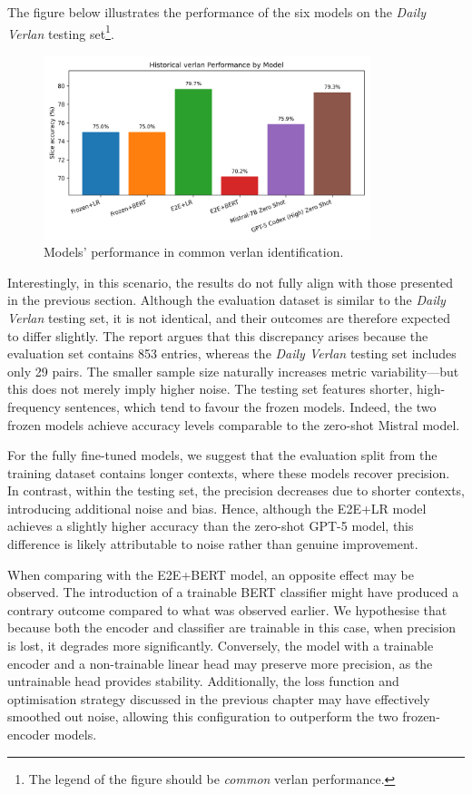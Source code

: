 \documentclass[12pt]{article}
\begin{document}
The figure below illustrates the performance of the six models on the \textit{Daily Verlan} testing set\footnote{The legend of the figure should be \textit{common} verlan performance.}.

\begin{figure}[H]
    \centering
    \includegraphics[width=0.85\textwidth]{figures/historical_verlan_comparison.png}
    \caption{Models' performance in common verlan identification.}
    \label{fig:historical-verlan-comparison}
\end{figure}

Interestingly, in this scenario, the results do not fully align with those presented in the previous section. 
Although the evaluation dataset is similar to the \textit{Daily Verlan} testing set, it is not identical, and their outcomes are therefore expected to differ slightly. 
The report argues that this discrepancy arises because the evaluation set contains 853 entries, whereas the \textit{Daily Verlan} testing set includes only 29 pairs. 
The smaller sample size naturally increases metric variability\;---\;but this does not merely imply higher noise. 
The testing set features shorter, high-frequency sentences, which tend to favour the frozen models. 
Indeed, the two frozen models achieve accuracy levels comparable to the zero-shot Mistral model.

For the fully fine-tuned models, we suggest that the evaluation split from the training dataset contains longer contexts, where these models recover precision. 
In contrast, within the testing set, the precision decreases due to shorter contexts, introducing additional noise and bias. 
Hence, although the E2E+LR model achieves a slightly higher accuracy than the zero-shot GPT-5 model, this difference is likely attributable to noise rather than genuine improvement.

When comparing with the E2E+BERT model, an opposite effect may be observed. 
The introduction of a trainable BERT classifier might have produced a contrary outcome compared to what was observed earlier. 
We hypothesise that because both the encoder and classifier are trainable in this case, when precision is lost, it degrades more significantly. 
Conversely, the model with a trainable encoder and a non-trainable linear head may preserve more precision, as the untrainable head provides stability. 
Additionally, the loss function and optimisation strategy discussed in the previous chapter may have effectively smoothed out noise, allowing this configuration to outperform the two frozen-encoder models.
\end{document}
